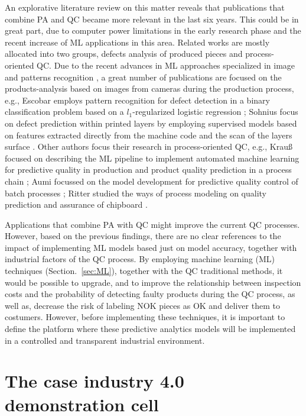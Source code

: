 \documentclass[5p,times,procedia]{elsarticle}
\begin{document}
An explorative literature review on this matter reveals that publications that combine PA and QC became more relevant in the last six years. This could be in great part, due to computer power limitations in the early research phase and the recent increase of ML applications in this area. Related works are mostly allocated into two groups, defects analysis of produced pieces and process-oriented QC.
Due to the recent advances in ML approaches specialized in image and patterns recognition \cite{bishop2006pattern}, a great number of publications are focused on the products-analysis based on images from cameras during the production process,
e.g., Escobar employs pattern recognition for defect detection in a binary classification problem based on a $l_1$-regularized logistic regression \cite{Carlos2018MLforQC}; Sohnius focus on defect prediction within printed layers by employing supervised models based on features extracted directly from the machine code and the scan of the layers surface \cite{Sohnius2019PASurfacequality}.
Other authors focus their research in process-oriented QC, e.g., 
Krauß focused on describing the ML pipeline to implement automated machine learning for predictive quality in production \cite{krauss2020automated} and product quality prediction in a process chain \cite{krauss2019machine}; Aumi focussed on the model development for predictive quality control of batch processes \cite{aumi2012model}; Ritter studied the ways of process modeling on quality prediction and assurance of chipboard \cite{ritter1992neue}.

Applications that combine PA with QC might improve the current QC processes. However, based on the previous findings, there are no clear references to the impact of implementing ML models based just on model accuracy, together with industrial factors of the QC process. 
By employing machine learning (ML) techniques (Section.~\ref{sec:ML}), together with the QC traditional methods, it would be possible to upgrade, and to improve the relationship between inspection costs and the probability of detecting faulty products during the QC process, as well as, decrease the risk of labeling NOK pieces as OK and deliver them to costumers. However, before implementing these techniques, it is important to define the platform where these predictive analytics models will be implemented in a controlled and transparent industrial environment. 
  
\section{The case industry 4.0 demonstration cell}  \label{sec:democell}%
\end{document}
